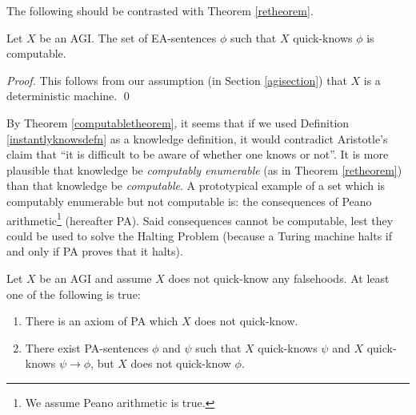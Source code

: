 \documentclass[runningheads]{llncs}
\begin{document}
The following should be contrasted with Theorem \ref{retheorem}.

\begin{theorem}
\label{computabletheorem}
  Let $X$ be an AGI.
  The set of EA-sentences $\phi$ such that $X$ quick-knows $\phi$ is computable.
\end{theorem}

\begin{proof}
  This follows from our assumption (in Section \ref{agisection}) that
  $X$ is a deterministic machine.
  \qed
\end{proof}

By Theorem \ref{computabletheorem}, it seems that if we used
Definition \ref{instantlyknowsdefn} as a knowledge definition, it would
contradict Aristotle's claim that
``it is difficult to be aware of whether one
knows or not''. It is more plausible that knowledge be \emph{computably enumerable}
(as in Theorem \ref{retheorem}) than that knowledge be \emph{computable}.
A prototypical example of a set which is computably enumerable but not computable
is: the consequences of Peano arithmetic\footnote{We assume Peano
arithmetic is true.} (hereafter PA).
Said consequences cannot be computable, lest they could be used to solve the Halting
Problem (because a Turing machine halts if and only if PA proves that it halts).

\begin{theorem}
\label{badnesstheorem}
Let $X$ be an AGI and assume $X$ does not quick-know any falsehoods.
At least one of the following is true:
\begin{enumerate}
  \item There is an axiom of PA which $X$ does not quick-know.
  \item There exist PA-sentences $\phi$ and $\psi$
  such that $X$ quick-knows $\psi$ and $X$ quick-knows $\psi\rightarrow\phi$,
  but $X$ does not quick-know $\phi$.
\end{enumerate}
\end{theorem}
\end{document}
